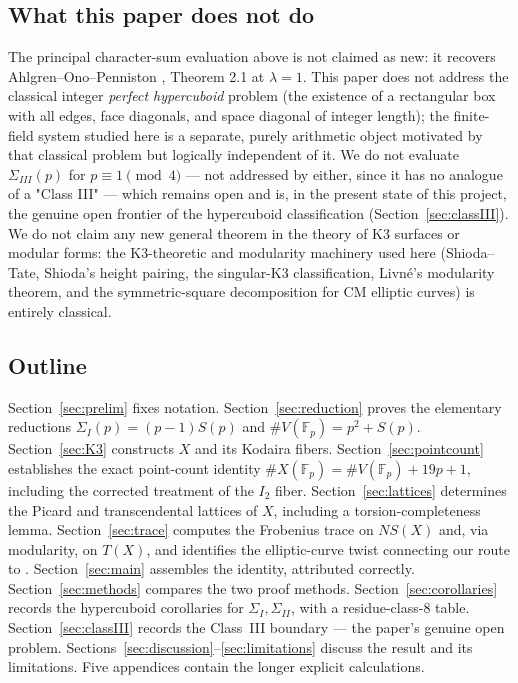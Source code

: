 \documentclass[11pt]{amsart}
\theoremstyle{definition}
\newcommand{\Fp}{\mathbb{F}_p}
\begin{document}
\subsection*{What this paper does not do}
The principal character-sum evaluation above is not claimed as new: it recovers Ahlgren--Ono--Penniston \cite{AOP2002}, Theorem 2.1 at $\lambda=1$. This paper does not address the classical integer \emph{perfect hypercuboid} problem (the existence of a rectangular box with all edges, face diagonals, and space diagonal of integer length); the finite-field system studied here is a separate, purely arithmetic object motivated by that classical problem but logically independent of it. We do not evaluate $\Sigma_{III}(p)$ for $p\equiv1\pmod4$ — not addressed by \cite{AOP2002} either, since it has no analogue of a "Class III" — which remains open and is, in the present state of this project, the genuine open frontier of the hypercuboid classification (Section~\ref{sec:classIII}). We do not claim any new general theorem in the theory of K3 surfaces or modular forms: the K3-theoretic and modularity machinery used here (Shioda--Tate, Shioda's height pairing, the singular-K3 classification, Livn\'e's modularity theorem, and the symmetric-square decomposition for CM elliptic curves) is entirely classical.

\subsection*{Outline}
Section~\ref{sec:prelim} fixes notation. Section~\ref{sec:reduction} proves the elementary reductions $\Sigma_I(p)=(p-1)S(p)$ and $\#V(\Fp)=p^2+S(p)$. Section~\ref{sec:K3} constructs $X$ and its Kodaira fibers. Section~\ref{sec:pointcount} establishes the exact point-count identity $\#X(\Fp)=\#V(\Fp)+19p+1$, including the corrected treatment of the $I_2$ fiber. Section~\ref{sec:lattices} determines the Picard and transcendental lattices of $X$, including a torsion-completeness lemma. Section~\ref{sec:trace} computes the Frobenius trace on $NS(X)$ and, via modularity, on $T(X)$, and identifies the elliptic-curve twist connecting our route to \cite{AOP2002}. Section~\ref{sec:main} assembles the identity, attributed correctly. Section~\ref{sec:methods} compares the two proof methods. Section~\ref{sec:corollaries} records the hypercuboid corollaries for $\Sigma_I,\Sigma_{II}$, with a residue-class-$8$ table. Section~\ref{sec:classIII} records the Class~III boundary — the paper's genuine open problem. Sections~\ref{sec:discussion}--\ref{sec:limitations} discuss the result and its limitations. Five appendices contain the longer explicit calculations.
\end{document}
